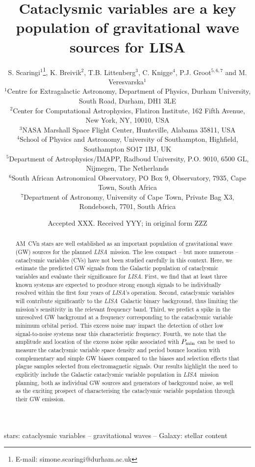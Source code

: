\documentclass[fleqn,usenatbib]{mnras}
\title[LISA CVs]{Cataclysmic variables are a key population of gravitational wave sources for LISA}
\author[S. Scaringi et al.]{
S. Scaringi$^{1}$\thanks{E-mail: simone.scaringi@durham.ac.uk},
K. Breivik$^{2}$,
T.B. Littenberg$^{3}$,
C. Knigge$^{4}$,
P.J. Groot$^{5,6,7}$ and
M. Veresvarska$^{1}$
\\
$^{1}$Centre for Extragalactic Astronomy, Department of Physics, Durham University, South Road, Durham, DH1 3LE\\
$^{2}$Center for Computational Astrophysics, Flatiron Institute, 162 Fifth Avenue, New York, NY, 10010, USA\\
$^{3}$NASA Marshall Space Flight Center, Huntsville, Alabama 35811, USA\\
$^{4}$School of Physics and Astronomy, University of Southampton, Highfield, Southampton SO17 1BJ, UK\\
$^{5}$Department of Astrophysics/IMAPP, Radboud University, P.O. 9010, 6500 GL, Nijmegen, The Netherlands\\
$^{6}$South African Astronomical Observatory, PO Box 9, Observatory, 7935, Cape Town, South Africa\\
$^{7}$Department of Astronomy, University of Cape Town, Private Bag X3, Rondebosch, 7701, South Africa\\
}
\date{Accepted XXX. Received YYY; in original form ZZZ}
\newcommand{\lisa}{{\it LISA}}
\begin{document}
\maketitle

\begin{abstract}
AM~CVn stars are well established as an important population of gravitational wave (GW) sources for the planned \lisa\ mission. The less compact – but more numerous – cataclysmic variables (CVs) have not been studied carefully in this context. Here, we estimate the predicted GW signals from the Galactic population of cataclysmic variables and evaluate their significance for \lisa. First, we find that at least three known systems are expected to produce strong enough signals to be individually resolved within the first four years of \lisa's operation. Second, cataclysmic variables will contribute significantly to the \lisa\ Galactic binary background, thus limiting the mission's sensitivity in the relevant frequency band. Third, we predict a spike in the unresolved GW background at a frequency corresponding to the cataclysmic variable minimum orbital period. This excess noise may impact the detection of other low signal-to-noise systems near this characteristic frequency. Fourth, we note that the amplitude and location of the excess noise spike associated with $P_{\rm{min}}$ can be used to measure the cataclysmic variable space density and period bounce location with complementary and simple GW biases compared to the biases and selection effects that plague samples selected from electromagnetic signals. Our results highlight the need to explicitly include the Galactic cataclysmic variable population in \lisa\ mission planning, both as individual GW sources and generators of background noise, as well as the exciting prospect of characterising the cataclysmic variable population through their GW emission.
\end{abstract}
    
    
\begin{keywords}
    stars: cataclysmic variables -- gravitational waves -- Galaxy: stellar content 
\end{keywords}

\end{document}
